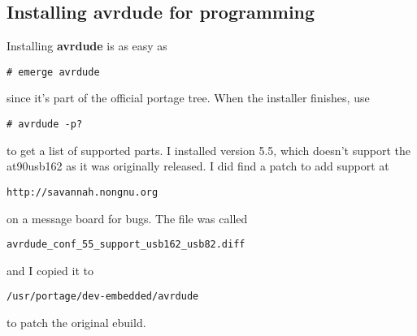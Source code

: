 \subsection{Installing \textbf{avrdude} for programming}
\label{avrdude_subsection}
Installing \textbf{avrdude} is as easy as
\begin{center}
    \vspace{-\baselineskip}
    \begin{boxedminipage}[t]{\textwidth}
        \texttt{\# emerge avrdude}
    \end{boxedminipage}
\end{center}
since it's part of the official portage tree.  When the installer
finishes, use
\begin{center}
    \vspace{-\baselineskip}
    \begin{boxedminipage}[t]{\textwidth}
        \texttt{\# avrdude -p?}
    \end{boxedminipage}
\end{center}
to get a list of supported parts.  I installed version 5.5, which
doesn't support the at90usb162 as it was originally released.  I did
find a patch to add support at
\begin{center}
    \vspace{-0.5\baselineskip}
    \verb+http://savannah.nongnu.org+
    \vspace{-0.5\baselineskip}
\end{center}
on a message board for bugs.  The file was called
\begin{center}
    \vspace{-0.5\baselineskip}
    \verb+avrdude_conf_55_support_usb162_usb82.diff+
    \vspace{-0.5\baselineskip}
\end{center}
and I copied it to
\begin{center}
    \vspace{-0.5\baselineskip}
    \verb+/usr/portage/dev-embedded/avrdude+
    \vspace{-0.5\baselineskip}
\end{center}
to patch the original ebuild.

